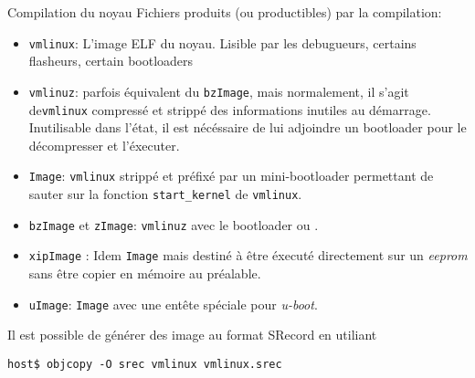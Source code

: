 \begin{frame}[fragile=singleslide]{Compilation du noyau}
  Fichiers produits (ou productibles) par la compilation:
  \begin{itemize}
  \item  \verb+vmlinux+:  L'image  ELF  du  noyau.   Lisible  par  les
    debugueurs, certains flasheurs, certain bootloaders
  \item  \verb+vmlinuz+: parfois  équivalent  du \verb+bzImage+,  mais
    normalement, il  s'agit de\verb+vmlinux+ compressé  et strippé des
    informations inutiles  au démarrage. Inutilisable  dans l'état, il
    est nécéssaire de lui adjoindre un bootloader pour le décompresser
    et l'éxecuter.
  \item  \verb+Image+:  \verb+vmlinux+   strippé  et  préfixé  par  un
    mini-bootloader   permettant    de   sauter   sur    la   fonction
    \verb+start_kernel+ de \verb+vmlinux+.
  \item  \verb+bzImage+  et   \verb+zImage+:  \verb+vmlinuz+  avec  le
    bootloader  ou .
  \item  \verb+xipImage+  :  Idem  \verb+Image+ mais  destiné  à  être
    éxecuté  directement  sur un  \emph{eeprom}  sans  être copier  en
    mémoire au préalable.
  \item  \verb+uImage+:  \verb+Image+ avec  une  entête spéciale  pour
    \emph{u-boot}.
  \end{itemize}
  Il est possible  de générer des image au  format SRecord en utiliant
  \begin{lstlisting}
host$ objcopy -O srec vmlinux vmlinux.srec
   \end{lstlisting}
\end{frame}


